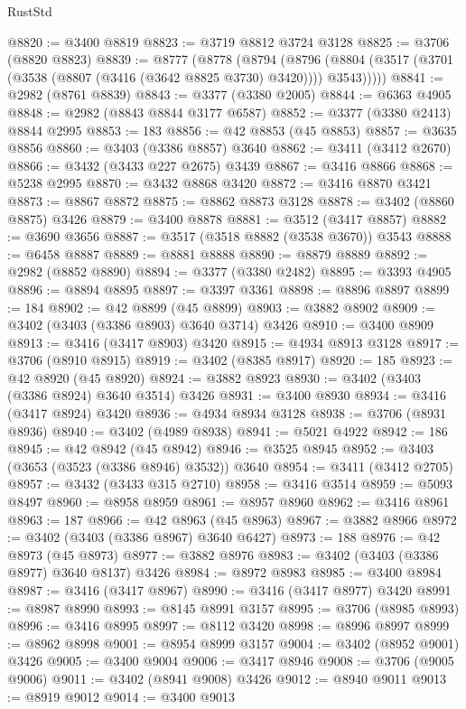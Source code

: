 \begin{lexlean}{RustStd}
\begin{coremodule}
@8820 := @3400 @8819
@8823 := @3719 @8812 @3724 @3128
@8825 := @3706 (@8820 @8823)
@8839 := @8777
    (@8778
      (@8794
        (@8796 (@8804 (@3517 (@3701 (@3538 (@8807 (@3416 (@3642 @8825 @3730) @3420)))) @3543)))))
@8841 := @2982 (@8761 @8839)
@8843 := @3377 (@3380 @2005)
@8844 := @6363 @4905
@8848 := @2982 (@8843 @8844 @3177 @6587)
@8852 := @3377 (@3380 @2413) @8844 @2995
@8853 := 183
@8856 := @42 @8853 (@45 @8853)
@8857 := @3635 @8856
@8860 := @3403 (@3386 @8857) @3640
@8862 := @3411 (@3412 @2670)
@8866 := @3432 (@3433 @227 @2675) @3439
@8867 := @3416 @8866
@8868 := @5238 @2995
@8870 := @3432 @8868 @3420
@8872 := @3416 @8870 @3421
@8873 := @8867 @8872
@8875 := @8862 @8873 @3128
@8878 := @3402 (@8860 @8875) @3426
@8879 := @3400 @8878
@8881 := @3512 (@3417 @8857)
@8882 := @3690 @3656
@8887 := @3517 (@3518 @8882 (@3538 @3670)) @3543
@8888 := @6458 @8887
@8889 := @8881 @8888
@8890 := @8879 @8889
@8892 := @2982 (@8852 @8890)
@8894 := @3377 (@3380 @2482)
@8895 := @3393 @4905
@8896 := @8894 @8895
@8897 := @3397 @3361
@8898 := @8896 @8897
@8899 := 184
@8902 := @42 @8899 (@45 @8899)
@8903 := @3882 @8902
@8909 := @3402 (@3403 (@3386 @8903) @3640 @3714) @3426
@8910 := @3400 @8909
@8913 := @3416 (@3417 @8903) @3420
@8915 := @4934 @8913 @3128
@8917 := @3706 (@8910 @8915)
@8919 := @3402 (@8385 @8917)
@8920 := 185
@8923 := @42 @8920 (@45 @8920)
@8924 := @3882 @8923
@8930 := @3402 (@3403 (@3386 @8924) @3640 @3514) @3426
@8931 := @3400 @8930
@8934 := @3416 (@3417 @8924) @3420
@8936 := @4934 @8934 @3128
@8938 := @3706 (@8931 @8936)
@8940 := @3402 (@4989 @8938)
@8941 := @5021 @4922
@8942 := 186
@8945 := @42 @8942 (@45 @8942)
@8946 := @3525 @8945
@8952 := @3403 (@3653 (@3523 (@3386 @8946) @3532)) @3640
@8954 := @3411 (@3412 @2705)
@8957 := @3432 (@3433 @315 @2710)
@8958 := @3416 @3514
@8959 := @5093 @8497
@8960 := @8958 @8959
@8961 := @8957 @8960
@8962 := @3416 @8961
@8963 := 187
@8966 := @42 @8963 (@45 @8963)
@8967 := @3882 @8966
@8972 := @3402 (@3403 (@3386 @8967) @3640 @6427)
@8973 := 188
@8976 := @42 @8973 (@45 @8973)
@8977 := @3882 @8976
@8983 := @3402 (@3403 (@3386 @8977) @3640 @8137) @3426
@8984 := @8972 @8983
@8985 := @3400 @8984
@8987 := @3416 (@3417 @8967)
@8990 := @3416 (@3417 @8977) @3420
@8991 := @8987 @8990
@8993 := @8145 @8991 @3157
@8995 := @3706 (@8985 @8993)
@8996 := @3416 @8995
@8997 := @8112 @3420
@8998 := @8996 @8997
@8999 := @8962 @8998
@9001 := @8954 @8999 @3157
@9004 := @3402 (@8952 @9001) @3426
@9005 := @3400 @9004
@9006 := @3417 @8946
@9008 := @3706 (@9005 @9006)
@9011 := @3402 (@8941 @9008) @3426
@9012 := @8940 @9011
@9013 := @8919 @9012
@9014 := @3400 @9013

\end{coremodule}
\end{lexlean}
